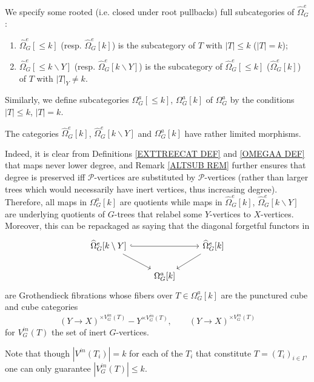 \documentclass[a4paper,10pt]{article}%
\begin{document}
\begin{definition}\label{TREE_FILTRATION_PIECES_DEFINITION}
We specify some rooted (i.e. closed under root pullbacks)
full subcategories
 of $\widehat{\Omega}_{G}^e$: 
  \begin{enumerate}
  \item $\widehat{\Omega}_G^e[\leq\! k]$ 
  (resp. $\widehat{\Omega}_G^e[k]$) is the subcategory of $T$ with $|T|\leq k$ ($|T| = k$);
  \item $\widehat{\Omega}_G^e[\leq\! k \mathbin{\backslash} Y]$
  (resp. $\widehat{\Omega}_G^e[k \mathbin{\backslash} Y]$) is the subcategory of $\widehat{\Omega}_G^e[\leq\! k]$ 
  ($\widehat{\Omega}_G^e[k]$) of $T$ with $|T|_{Y}\neq k$.
  \end{enumerate}
Similarly, we define subcategories 
$\Omega_G^a[\leq \! k]$, 
$\Omega_G^a[k]$ of $\Omega_G^a$
by the conditions $|T|\leq k$, $|T|=k$.
\end{definition}


\begin{remark}\label{LIMMOR REM}
  The categories 
  $\widehat{\Omega}_G^e[k]$, $\widehat{\Omega}_G^e[k \mathbin{\backslash} Y]$ and $\Omega_G^a[k]$
  have rather limited morphisms.
  
Indeed, it is clear from Definitions 
\ref{EXTTREECAT DEF} and \ref{OMEGAA DEF} 
that maps never lower degree,
and Remark \ref{ALTSUB REM} further ensures that degree is preserved iff
$\mathcal{P}$-vertices are substituted by $\mathcal{P}$-vertices (rather than larger trees
which would necessarily have inert vertices, thus increasing degree).
Therefore, all maps in $\Omega_G^a[k]$ are quotients while maps in $\widehat{\Omega}_G^e[k]$, $\widehat{\Omega}_G^e[k \mathbin{\backslash} Y]$
are underlying quotients of $G$-trees that 
relabel some $Y$-vertices to $X$-vertices.  
 Moreover, this can be repackaged as saying that 
  the diagonal forgetful functors in
\[
\begin{tikzcd}
  \widehat\Omega_G^e[k \mathbin{\backslash} Y] \arrow[dr] \arrow[rr, hookrightarrow] 
  && \widehat\Omega_G^e[k] \arrow[dl]\\
  & \Omega_G^a[k]
\end{tikzcd}
\]  
 are Grothendieck fibrations whose fibers over 
 $T \in \Omega_G^a[k]$
 are the punctured cube and cube categories
\[
	(Y \to X)^{\times V_G^{in}(T)} - Y^{\times  V_G^{in}(T)},
\qquad
	(Y \to X)^{\times V_G^{in}(T)}
\]
for $V_G^{in}(T)$ the set of inert $G$-vertices.

Note that though 
$|V^{in}(T_i)| = k$
for each of the $T_i$ that constitute $T=(T_i)_{i \in I}$,
one can only guarantee $|V_G^{in}(T)| \leq k$.
\end{remark}
\end{document}
